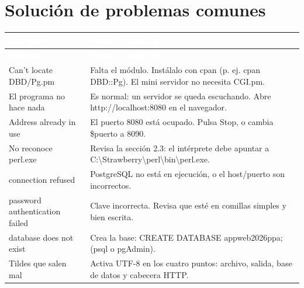\documentclass[11pt]{article}
\begin{document}
\section{Solución de problemas comunes}
{\renewcommand{\arraystretch}{1.25}
\begin{longtable}{>{\raggedright\arraybackslash}p{4.3cm} >{\raggedright\arraybackslash}p{11.1cm}}
\rowcolor{uteqverde}\textcolor{white}{\textbf{Síntoma}} & \textcolor{white}{\textbf{Causa y solución}} \\
\endfirsthead
\rowcolor{uteqverde}\textcolor{white}{\textbf{Síntoma}} & \textcolor{white}{\textbf{Causa y solución}} \\
\endhead
\ttfamily\color{uteqverde}Can't locate DBD/Pg.pm & Falta el módulo. Instálalo con cpan (p. ej. cpan DBD::Pg). El mini servidor no necesita CGI.pm. \\ \hline
\ttfamily\color{uteqverde}El programa no hace nada & Es normal: un servidor se queda escuchando. Abre http://localhost:8080 en el navegador. \\ \hline
\ttfamily\color{uteqverde}Address already in use & El puerto 8080 está ocupado. Pulsa Stop, o cambia \$puerto a 8090. \\ \hline
\ttfamily\color{uteqverde}No reconoce perl.exe & Revisa la sección 2.3: el intérprete debe apuntar a C:\textbackslash{}Strawberry\textbackslash{}perl\textbackslash{}bin\textbackslash{}perl.exe. \\ \hline
\ttfamily\color{uteqverde}connection refused & PostgreSQL no está en ejecución, o el host/puerto son incorrectos. \\ \hline
\ttfamily\color{uteqverde}password authentication failed & Clave incorrecta. Revisa que esté en comillas simples y bien escrita. \\ \hline
\ttfamily\color{uteqverde}database does not exist & Crea la base: CREATE DATABASE appweb2026ppa; (psql o pgAdmin). \\ \hline
\ttfamily\color{uteqverde}Tildes que salen mal & Activa UTF-8 en los cuatro puntos: archivo, salida, base de datos y cabecera HTTP. \\ \hline
\end{longtable}}
\end{document}
